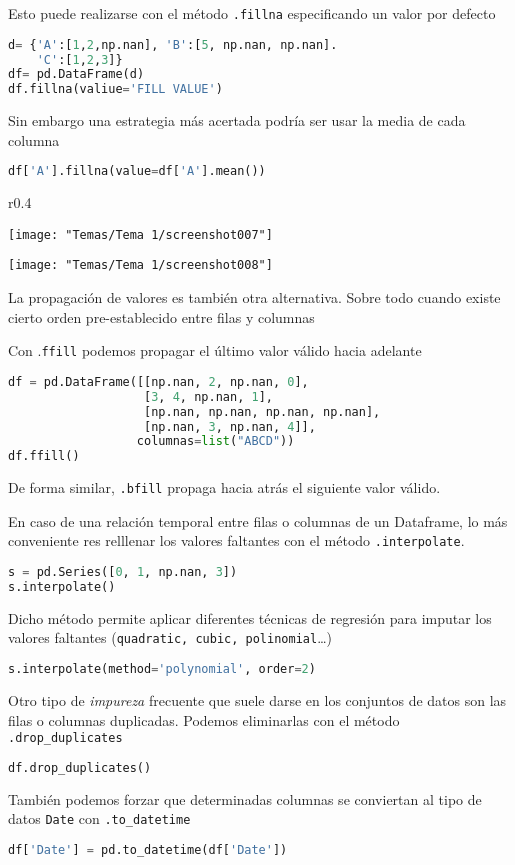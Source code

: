 Esto puede realizarse con el método \texttt{.fillna} especificando un valor por defecto
\begin{lstlisting}[language=python]
d= {'A':[1,2,np.nan], 'B':[5, np.nan, np.nan].
	'C':[1,2,3]}
df= pd.DataFrame(d)
df.fillna(valiue='FILL VALUE')
\end{lstlisting}
Sin embargo una estrategia más acertada podría ser usar la media de cada columna
\begin{lstlisting}[language=python]
df['A'].fillna(value=df['A'].mean())
\end{lstlisting}
\begin{wrapfigure}[8]{r}{0.4\textwidth}
	\begin{center}
		\texttt{[image: "Temas/Tema 1/screenshot007"]}
	\end{center}
	
	\hspace{2cm}
	
	\begin{center}
		\texttt{[image: "Temas/Tema 1/screenshot008"]}
	\end{center}
\end{wrapfigure}
La propagación de valores es también otra alternativa. Sobre todo cuando existe cierto orden pre-establecido entre filas y columnas

Con .\texttt{ffill} podemos propagar el último valor válido hacia adelante
\begin{lstlisting}[language=python, fontadjust, basicstyle=\small\ttfamily]
df = pd.DataFrame([[np.nan, 2, np.nan, 0],
                   [3, 4, np.nan, 1],
                   [np.nan, np.nan, np.nan, np.nan],
                   [np.nan, 3, np.nan, 4]],
                  columnas=list("ABCD"))
df.ffill()
\end{lstlisting}

De forma similar, \texttt{.bfill} propaga hacia atrás el siguiente valor válido.

En caso de una relación temporal entre filas o columnas de un Dataframe, lo más conveniente res relllenar los valores faltantes con el método \texttt{.interpolate}.
\begin{lstlisting}[language=python]
s = pd.Series([0, 1, np.nan, 3])
s.interpolate()
\end{lstlisting}
Dicho método permite aplicar diferentes técnicas de regresión para imputar los valores faltantes (\texttt{quadratic, cubic, polinomial}\dots)
\begin{lstlisting}[language=python]
s.interpolate(method='polynomial', order=2)
\end{lstlisting}
Otro tipo de \textit{impureza} frecuente que suele darse en los conjuntos de datos son las filas o columnas duplicadas. Podemos eliminarlas con el método \texttt{.drop_duplicates}
\begin{lstlisting}[language=python]
df.drop_duplicates()
\end{lstlisting}
También podemos forzar que determinadas columnas se conviertan al tipo de datos \texttt{Date} con \texttt{.to_datetime}
\begin{lstlisting}[language=python]
df['Date'] = pd.to_datetime(df['Date'])
\end{lstlisting}
